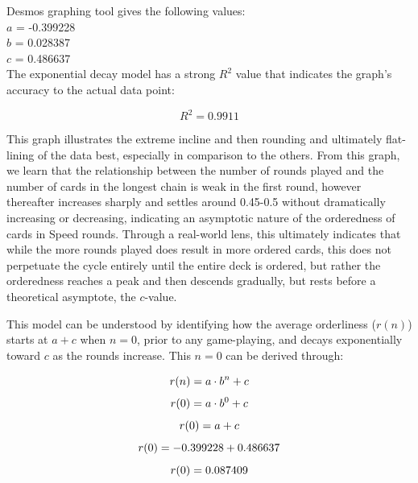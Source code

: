 Desmos graphing tool gives the following values:\\
$a$ = -0.399228  \\
$b$ = 0.028387 \\
$c$ = 0.486637 \\


The exponential decay model has a strong $R^2$ value that indicates the graph's accuracy to the actual data point:

\begin{equation}
	R^2=0.9911
	\label{eq:R^2value}
\end{equation}

This graph illustrates the extreme incline and then rounding and ultimately flat-lining of the data best, especially in comparison to the others. From this graph, we learn that the relationship between the number of rounds played and the number of cards in the longest chain is weak in the first round, however thereafter increases sharply and settles around 0.45-0.5 without dramatically increasing or decreasing, indicating an asymptotic nature of the orderedness of cards in Speed rounds. Through a real-world lens, this ultimately indicates that while the more rounds played does result in more ordered cards, this does not perpetuate the cycle entirely until the entire deck is ordered, but rather the orderedness reaches a peak and then descends gradually, but rests before a theoretical asymptote, the $c$-value.


This model can be understood by identifying how the average orderliness ($r(n)$) starts at $a+c$ when $n=0$, prior to any game-playing, and decays exponentially toward $c$ as the rounds increase. This $n=0$ can be derived through:

\begin{equation}
r(n)={a\cdot{b}^{n}+c} \\
\end{equation}
\begin{equation}
r(0)={a\cdot{b}^{0}+c} \\
\end{equation}
\begin{equation}
r(0)=a+c \\
\end{equation}
\begin{equation}
r(0)=-0.399228+0.486637 \\
\end{equation}
\begin{equation}
r(0)=0.087409 \\
\label{initialOrder}	
\end{equation}

